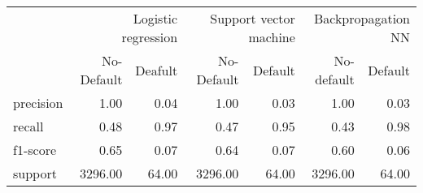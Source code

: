\begin{table}
\thcenter
\begin{tabular}{lrrrrrr}
 & \multicolumn{2}{r}{Logistic regression} & \multicolumn{2}{r}{Support vector machine} & \multicolumn{2}{r}{Backpropagation NN} \\
 & No-Default & Deafult & No-Default & Default & No-default & Default \\
precision & 1.00 & 0.04 & 1.00 & 0.03 & 1.00 & 0.03 \\
recall & 0.48 & 0.97 & 0.47 & 0.95 & 0.43 & 0.98 \\
f1-score & 0.65 & 0.07 & 0.64 & 0.07 & 0.60 & 0.06 \\
support & 3296.00 & 64.00 & 3296.00 & 64.00 & 3296.00 & 64.00 \\
\end{tabular}
\end{table}
